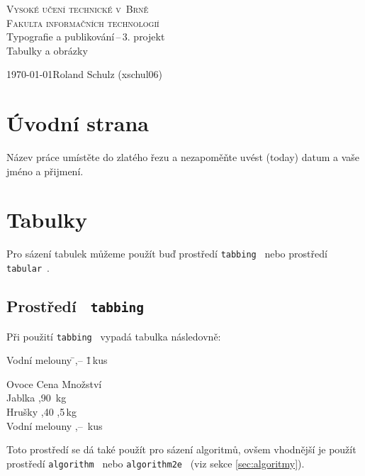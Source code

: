 \documentclass[a4paper,11pt]{article}
\newcommand*{\mojettt}[1]{\ \texttt{#1}}
\newcommand*{\mojetttext}[1]{\: \texttt{#1}\ }
\begin{document}
\begin{titlepage}
    \begin{center}
        {\Huge \textsc{Vysoké učení technické v~Brně} \\[0.5em]} {\huge \textsc{Fakulta informačních technologií}} \\
        {\LARGE Typografie a publikování\,--\,3. projekt \\[0.4em] {\Huge Tabulky a obrázky }}\\
    \end{center}

    {\Large \today \hfill Roland Schulz (xschul06)}
    \thispagestyle{empty}
\end{titlepage}


\section{Úvodní strana}
Název práce umístěte do zlatého řezu a nezapoměňte uvést  (today) datum a vaše jméno a přijmení.

\section{Tabulky}
Pro sázení tabulek můžeme použít buď prostředí \mojetttext{tabbing} nebo prostředí \mojetttext{tabular}.
\subsection{Prostředí \mojettt{tabbing}}
Při použití \mojetttext{tabbing} vypadá tabulka následovně:
\begin{table}[ht]
\begin{tabbing}
    Vodní melouny \quad\=,-- \= 1\,kus\kill

    Ovoce \> Cena \> Množství \\
    Jablka ,90 \,kg \\
    Hrušky ,40 ,5\,kg \\ 
    Vodní melouny ,-- \,kus
\end{tabbing}
\end{table}

\noindent Toto prostředí se dá také použít pro sázení algoritmů, ovšem vhodnější je použít prostředí \mojetttext{algorithm} nebo \mojetttext{algorithm2e} (viz sekce \ref{sec:algoritmy}).
\end{document}
